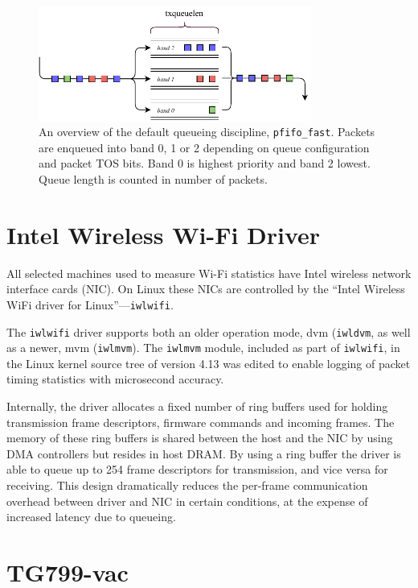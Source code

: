 \begin{figure}
\center
\includegraphics[width=0.8\textwidth]{images/pfifo-fast-queue.pdf}
\caption{An overview of the default queueing discipline, \texttt{pfifo\_fast}. Packets are enqueued into band 0, 1 or 2 depending on queue configuration and packet TOS bits. Band 0 is highest priority and band 2 lowest. Queue length is counted in number of packets.}
\label{fig:pfifofast}
\end{figure}

\section{Intel Wireless Wi-Fi Driver}

All selected machines used to measure Wi-Fi statistics have Intel wireless
network interface cards (NIC). On Linux these NICs are controlled by the ``Intel
Wireless WiFi driver for Linux''—\texttt{iwlwifi}.

The \texttt{iwlwifi} driver supports both an older operation mode, dvm
(\texttt{iwldvm}, as well as a newer, mvm (\texttt{iwlmvm}). The
\texttt{iwlmvm} module, included as part of \texttt{iwlwifi}, in the Linux
kernel source tree of version 4.13 was edited to enable logging of packet
timing statistics with microsecond accuracy.

Internally, the driver allocates a fixed number of ring buffers used for
holding transmission frame descriptors, firmware commands and incoming frames.
The memory of these ring buffers is shared between the host and the NIC by
using DMA controllers but resides in host DRAM. By using a ring buffer the
driver is able to queue up to 254 frame descriptors for transmission, and vice
versa for receiving. This design dramatically reduces the per-frame
communication overhead between driver and NIC in certain conditions, at the
expense of increased latency due to queueing.

\section{TG799-vac}

